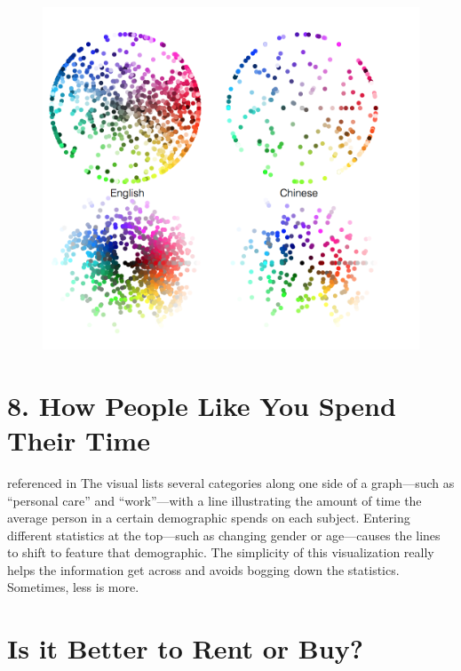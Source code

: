 \documentclass[]{book}
\theoremstyle{definition}
\theoremstyle{definition}
\theoremstyle{definition}
\theoremstyle{remark}
\begin{document}
\begin{figure}
\centering
\includegraphics{images/colorwords.png}
\caption{}
\end{figure}

\section{8. How People Like You Spend Their
Time}\label{how-people-like-you-spend-their-time}

\citep{spendingtime} referenced in \citep{cool_data} The visual lists
several categories along one side of a graph---such as ``personal care''
and ``work''---with a line illustrating the amount of time the average
person in a certain demographic spends on each subject. Entering
different statistics at the top---such as changing gender or
age---causes the lines to shift to feature that demographic. The
simplicity of this visualization really helps the information get across
and avoids bogging down the statistics. Sometimes, less is more.

\section{Is it Better to Rent or
Buy?}\label{is-it-better-to-rent-or-buy}
\end{document}
